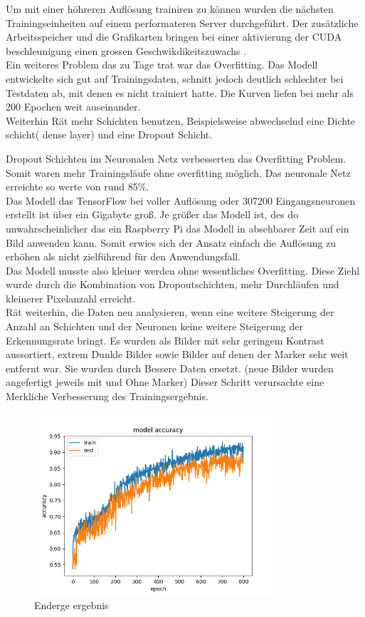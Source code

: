 \documentclass[conference]{IEEEtran}
\begin{document}
Um mit einer höhreren Auflösung trainiren zu können wurden die nächsten Trainingseinheiten auf einem performateren Server durchgeführt. Der zusätzliche Arbeitsspeicher und die Grafikarten bringen bei einer aktivierung der CUDA beschleunigung einen grossen Geschwikdikeitszuwachs . \\

Ein weiteres Problem das zu Tage trat war das Overfitting. Das Modell entwickelte sich gut auf Trainingsdaten, schnitt jedoch deutlich schlechter bei Testdaten ab, mit denen es nicht trainiert hatte. Die Kurven liefen bei mehr als 200 Epochen weit auseinander.\\


Weiterhin Rät \cite{b3} mehr Schichten benutzen, Beispielsweise abwechselnd eine Dichte schicht( dense layer) und eine Dropout Schicht.

Dropout Schichten im Neuronalen Netz verbesserten das Overfitting Problem. Somit waren mehr Trainingsläufe ohne overfitting möglich. Das neuronale Netz erreichte so werte von rund 85\%. \\

Das Modell das TensorFlow bei voller Auflösung oder 307200 Eingangsneuronen erstellt ist über ein Gigabyte groß. Je größer das Modell ist, des do unwahrscheinlicher das ein Raspberry Pi das Modell in absehbarer Zeit auf ein Bild anwenden kann. Somit erwies sich der Ansatz einfach die Auflösung zu erhöhen als nicht  zielführend für den Anwendungsfall. \\

Das Modell musste also kleiner werden ohne wesentliches Overfitting. Diese Ziehl wurde durch die Kombination von Dropoutschichten, mehr Durchläufen und kleinerer Pixelanzahl erreicht. \\

\cite{b3} Rät weiterhin, die Daten neu analysieren, wenn eine weitere Steigerung der Anzahl an Schichten und der Neuronen keine weitere Steigerung der Erkennungsrate bringt. Es wurden als Bilder mit sehr geringem Kontrast aussortiert, extrem Dunkle Bilder sowie Bilder auf denen der Marker sehr weit entfernt war. Sie wurden durch Bessere Daten ersetzt. (neue Bilder wurden angefertigt jeweils mit und Ohne Marker) Dieser Schritt verursachte eine Merkliche Verbesserung des Trainingsergebnis.
\\


\begin{figure}[!h]
	\centering
	\includegraphics[width=9cm]{img/213x160:800@32:0_accuracy.png}
	\caption{Enderge ergebnis}
	\label{end Ergenisse }
\end{figure}
\end{document}
